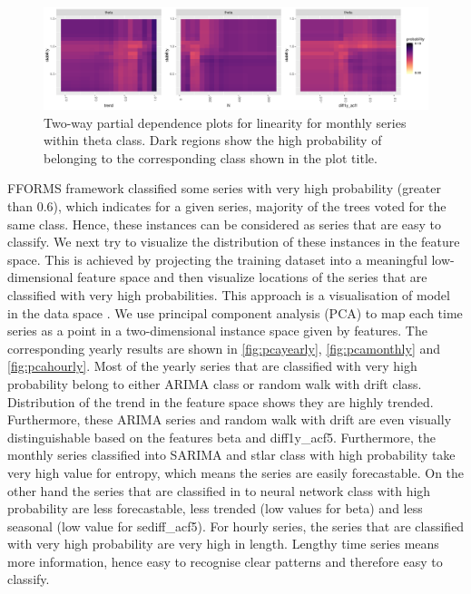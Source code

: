 \documentclass[11pt,a4paper,]{article}
\begin{document}
\begin{figure}[h]

{\centering \includegraphics[width=\textwidth]{figure/thetapdp-1} 

}

\caption{Two-way partial dependence plots for linearity for monthly series within theta class. Dark regions show the high probability of belonging to the corresponding class shown in the plot title.}\label{fig:thetapdp}
\end{figure}

FFORMS framework classified some series with very high probability (greater than 0.6), which indicates for a given series, majority of the trees voted for the same class. Hence, these instances can be considered as series that are easy to classify. We next try to visualize the distribution of these instances in the feature space. This is achieved by projecting the training dataset into a meaningful low-dimensional feature space and then visualize locations of the series that are classified with very high probabilities. This approach is a visualisation of model in the data space \autocite{wickham2015visualizing}. We use principal component analysis (PCA) to map each time series as a point in a two-dimensional instance space given by features. The corresponding yearly results are shown in \autoref{fig:pcayearly}, \autoref{fig:pcamonthly} and \autoref{fig:pcahourly}. Most of the yearly series that are classified with very high probability belong to either ARIMA class or random walk with drift class. Distribution of the trend in the feature space shows they are highly trended. Furthermore, these ARIMA series and random walk with drift are even visually distinguishable based on the features beta and diff1y\_acf5. Furthermore, the monthly series classified into SARIMA and stlar class with high probability take very high value for entropy, which means the series are easily forecastable. On the other hand the series that are classified in to neural network class with high probability are less forecastable, less trended (low values for beta) and less seasonal (low value for sediff\_acf5). For hourly series, the series that are classified with very high probability are very high in length. Lengthy time series means more information, hence easy to recognise clear patterns and therefore easy to classify.
\end{document}
